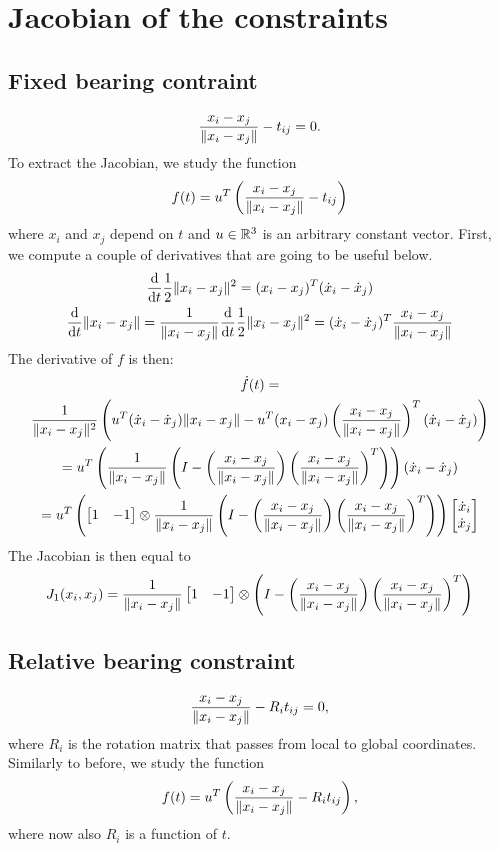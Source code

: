 \documentclass[12pt]{article}
\newcommand{\xixj}{x_i-x_j}
\newcommand{\dxixj}{\dot{x}_i-\dot{x}_j}
\newcommand{\nxixj}{\frac{\xixj}{\norm{\xixj}}}
\newcommand{\Ri}{R_i}
\newcommand{\dxi}{\dot{x}_i}
\newcommand{\dxj}{\dot{x}_j}
\newcommand{\kron}{\otimes}
\begin{document}
\section{Jacobian of the constraints}
\subsection{Fixed bearing contraint}
\begin{equation}
  \nxixj-\tij=0.
\end{equation}
To extract the Jacobian, we study the function
\begin{equation}
  f(t)=u\transpose\left(\nxixj-\tij\right)  
\end{equation}
where $x_i$ and $x_j$ depend on $t$ and $u\in\mathbb{R}^{3}{}$ is an arbitrary constant vector.
First, we compute a couple of derivatives that are going to be useful below.
\begin{gather}
  \dert\frac{1}{2}\norm{\xixj}^2=(\xixj)\transpose(\dxixj)\\
  \dert\norm{\xixj}=\frac{1}{\norm{\xixj}}\dert\frac{1}{2}\norm{\xixj}^2 =(\dxixj)\transpose\nxixj\label{eq:dernormxixj}
\end{gather}
The derivative of $f$ is then:
\begin{multline}
\dot{f}(t)=\\\frac{1}{\norm{\xixj}^2}\left(u\transpose(\dxixj)\norm{\xixj}-u\transpose(\xixj)\left(\nxixj\right)\transpose(\dxixj)\right)\\
=u\transpose\left(\frac{1}{\norm{\xixj}}\left(I-\left(\nxixj\right)\left(\nxixj\right)\transpose\right)\right)(\dxixj)\\
=u\transpose\left(\bmat{1 & -1}\kron \frac{1}{\norm{\xixj}}\left(I-\left(\nxixj\right)\left(\nxixj\right)\transpose\right)\right)\bmat{\dxi\\\dxj}
\end{multline}
The Jacobian is then equal to
\begin{equation}
J_1(x_i,x_j)=\frac{1}{\norm{\xixj}}\bmat{1 & -1}\kron\left(I-\left(\nxixj\right)\left(\nxixj\right)\transpose\right)
\end{equation}
\subsection{Relative bearing constraint}
\begin{equation}
  \nxixj-\Ri\tij=0,
\end{equation}
where $\Ri$ is the rotation matrix that passes from local to global coordinates.
Similarly to before, we study the function
\begin{equation}
  f(t)=u\transpose\left(\nxixj-R_i\tij\right),
\end{equation}
where now also $\Ri$ is a function of $t$.
\end{document}
